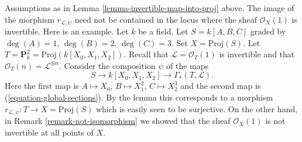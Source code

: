 \begin{remark}
\label{remark-not-in-invertible-locus}
Assumptions as in Lemma \ref{lemma-invertible-map-into-proj} above.
The image of the morphism $r_{\mathcal{L}, \psi}$ need not be
contained in the locus where the sheaf $\mathcal{O}_X(1)$
is invertible.
Here is an example.
Let $k$ be a field.
Let $S = k[A, B, C]$ graded by $\deg(A) = 1$, $\deg(B) = 2$, $\deg(C) = 3$.
Set $X = \text{Proj}(S)$.
Let $T = \mathbf{P}^2_k = \text{Proj}(k[X_0, X_1, X_2])$.
Recall that $\mathcal{L} = \mathcal{O}_T(1)$ is invertible
and that $\mathcal{O}_T(n) = \mathcal{L}^{\otimes n}$.
Consider the composition $\psi$ of the maps
$$
S \to k[X_0, X_1, X_2] \to \Gamma_*(T, \mathcal{L}).
$$
Here the first map is $A \mapsto X_0$, $B \mapsto X_1^2$,
$C \mapsto X_2^3$ and the second map is (\ref{equation-global-sections}).
By the lemma this corresponds to a morphism
$r_{\mathcal{L}, \psi} : T \to X = \text{Proj}(S)$
which is easily seen to be surjective. On the other hand, in
Remark \ref{remark-not-isomorphism} we showed that the sheaf
$\mathcal{O}_X(1)$ is not invertible at all points of $X$.
\end{remark}










